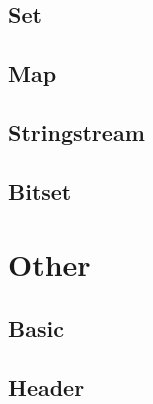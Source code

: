 \subsection{Set}


\subsection{Map}


\subsection{Stringstream}


\subsection{Bitset}






\section{Other}

\subsection{Basic}


\subsection{Header}


